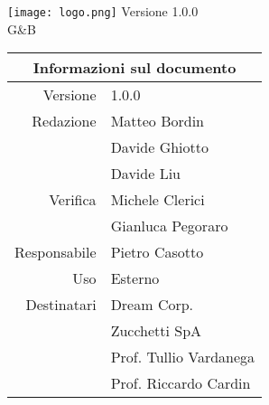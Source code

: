 \maketitle
	\begin{center}
	\hspace{5em}
	   \texttt{[image: logo.png]}\newline
	\huge Versione 1.0.0 
	\\G\&B
	
	\begin{table}[h!]
		\centering
		\begin{tabular}{r|l}
			\multicolumn{2}{c}{Informazioni sul documento}\\
			\hline
			Versione & 1.0.0 \\
			Redazione & Matteo Bordin\\
			& Davide Ghiotto\\
			& Davide Liu\\
			Verifica & Michele Clerici\\
			& Gianluca Pegoraro\\
			Responsabile & Pietro Casotto\\
			Uso & Esterno\\
			Destinatari & Dream Corp. \\
			& Zucchetti SpA\\
			& Prof. Tullio Vardanega\\
			& Prof. Riccardo Cardin\\
		\end{tabular}
	\end{table}
	
	\end{center}
	\newpage